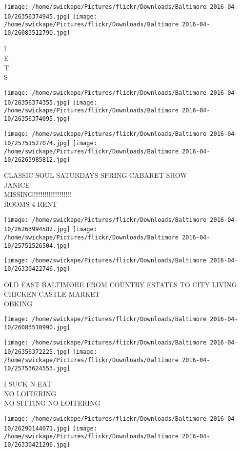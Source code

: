\documentclass[10pt,letterpaper]{article}
\begin{document}
\texttt{[image: /home/swickape/Pictures/flickr/Downloads/Baltimore 2016-04-10/26356374945.jpg]}
\texttt{[image: /home/swickape/Pictures/flickr/Downloads/Baltimore 2016-04-10/26083512790.jpg]}

I\\
E\\
T\\
S
\pagebreak

\texttt{[image: /home/swickape/Pictures/flickr/Downloads/Baltimore 2016-04-10/26356374355.jpg]}
\texttt{[image: /home/swickape/Pictures/flickr/Downloads/Baltimore 2016-04-10/26356374095.jpg]}

\texttt{[image: /home/swickape/Pictures/flickr/Downloads/Baltimore 2016-04-10/25751527074.jpg]}
\texttt{[image: /home/swickape/Pictures/flickr/Downloads/Baltimore 2016-04-10/26263985812.jpg]}

CLASSIC SOUL SATURDAYS SPRING CABARET SHOW\\
JANICE\\
MISSING!!!!!!!!!!!!!!!!!!!!\\
ROOMS 4 RENT
\pagebreak

\texttt{[image: /home/swickape/Pictures/flickr/Downloads/Baltimore 2016-04-10/26263994582.jpg]}
\texttt{[image: /home/swickape/Pictures/flickr/Downloads/Baltimore 2016-04-10/25751526504.jpg]}

\texttt{[image: /home/swickape/Pictures/flickr/Downloads/Baltimore 2016-04-10/26330422746.jpg]}

OLD EAST BALTIMORE FROM COUNTRY ESTATES TO CITY LIVING\\
CHICKEN CASTLE MARKET\\
OBKING
\pagebreak

\texttt{[image: /home/swickape/Pictures/flickr/Downloads/Baltimore 2016-04-10/26083510990.jpg]}

\vspace{0.25in}
\texttt{[image: /home/swickape/Pictures/flickr/Downloads/Baltimore 2016-04-10/26356372225.jpg]}
\texttt{[image: /home/swickape/Pictures/flickr/Downloads/Baltimore 2016-04-10/25753624553.jpg]}

I SUCK N EAT\\
NO LOITERING\\
NO SITTING NO LOITERING
\pagebreak

\texttt{[image: /home/swickape/Pictures/flickr/Downloads/Baltimore 2016-04-10/26290144071.jpg]}
\texttt{[image: /home/swickape/Pictures/flickr/Downloads/Baltimore 2016-04-10/26330421296.jpg]}
\end{document}
